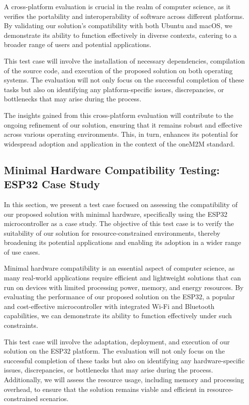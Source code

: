 \documentclass[a4paper,fleqn]{cas-dc}
\begin{document}
A cross-platform evaluation is crucial in the realm of computer science, as it verifies the portability and interoperability of software across different platforms. By validating our solution's compatibility with both Ubuntu and macOS, we demonstrate its ability to function effectively in diverse contexts, catering to a broader range of users and potential applications.

This test case will involve the installation of necessary dependencies, compilation of the source code, and execution of the proposed solution on both operating systems. The evaluation will not only focus on the successful completion of these tasks but also on identifying any platform-specific issues, discrepancies, or bottlenecks that may arise during the process.

The insights gained from this cross-platform evaluation will contribute to the ongoing refinement of our solution, ensuring that it remains robust and effective across various operating environments. This, in turn, enhances its potential for widespread adoption and application in the context of the oneM2M standard.

\subsection{Minimal Hardware Compatibility Testing: ESP32 Case Study}

In this section, we present a test case focused on assessing the compatibility of our proposed solution with minimal hardware, specifically using the ESP32 microcontroller as a case study. The objective of this test case is to verify the suitability of our solution for resource-constrained environments, thereby broadening its potential applications and enabling its adoption in a wider range of use cases.

Minimal hardware compatibility is an essential aspect of computer science, as many real-world applications require efficient and lightweight solutions that can run on devices with limited processing power, memory, and energy resources. By evaluating the performance of our proposed solution on the ESP32, a popular and cost-effective microcontroller with integrated Wi-Fi and Bluetooth capabilities, we can demonstrate its ability to function effectively under such constraints.

This test case will involve the adaptation, deployment, and execution of our solution on the ESP32 platform. The evaluation will not only focus on the successful completion of these tasks but also on identifying any hardware-specific issues, discrepancies, or bottlenecks that may arise during the process. Additionally, we will assess the resource usage, including memory and processing overhead, to ensure that the solution remains viable and efficient in resource-constrained scenarios.
\end{document}
